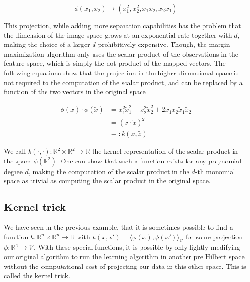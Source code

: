 \begin{equation*}
    \phi(x_1, x_2) \mapsto (x_1^2, x_2^2, x_1x_2, x_2x_1)
\end{equation*}

This projection, while adding more separation capabilities has the problem that the dimension of the image space grows at an exponential rate together with $d$, making the choice of a larger $d$ prohibitively expensive. Though, the margin maximization algorithm only uses the scalar product of the observations in the feature space, which is simply the dot product of the mapped vectors. The following equations show that the projection in the higher dimensional space is not required to the computation of the scalar product, and can be replaced by a function of the two vectors in the original space

\begin{equation*}
  \begin{aligned}
    \phi(x) \cdot \phi(\tilde{x})
    &= x_1^2\tilde{x}_1^2 + x_2^2\tilde{x}_2^2 + 2x_1x_2\tilde{x}_1\tilde{x}_2\\
    &= \left(x \cdot \tilde{x}\right)^2 \\
    &=: k(x, \tilde{x})
  \end{aligned}
\end{equation*}

We call $k(\cdot, \cdot) : \mathbb{R}^2 \times \mathbb{R}^2 \rightarrow \mathbb{R}$ the kernel representation of the scalar product in the space $\phi(\mathbb{R}^2)$. One can show that such a function exists for any polynomial degree $d$, making the computation of the scalar product in the $d$-th monomial space as trivial as computing the scalar product in the original space.

\subsection{Kernel trick}

We have seen in the previous example, that it is sometimes possible to find a function $k :\mathbb{R}^n \times \mathbb{R}^n \rightarrow \mathbb{R}$ with $k(x, x') = \langle \phi(x), \phi(x')\rangle _{\mathcal{V}}$ for some projection $\phi : \mathbb{R}^n \rightarrow \mathcal{V}$. With these special functions, it is possible by only lightly modifying our original algorithm to run the learning algorithm in another pre Hilbert space without the computational cost of projecting our data in this other space. This is called the kernel trick.

